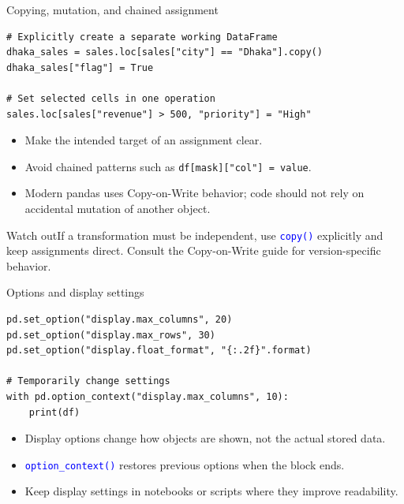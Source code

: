 \documentclass[aspectratio=169,10pt]{beamer}
\newcommand{\pitfall}[1]{\begin{alertblock}{Watch out}#1\end{alertblock}}
\newcommand{\method}[1]{\texttt{\textcolor{Blue}{#1}}}
\begin{document}
\begin{frame}[fragile]{Copying, mutation, and chained assignment}
\begin{lstlisting}
# Explicitly create a separate working DataFrame
dhaka_sales = sales.loc[sales["city"] == "Dhaka"].copy()
dhaka_sales["flag"] = True

# Set selected cells in one operation
sales.loc[sales["revenue"] > 500, "priority"] = "High"
\end{lstlisting}
\begin{itemize}
\item Make the intended target of an assignment clear.
\item Avoid chained patterns such as \texttt{df[mask]["col"] = value}.
\item Modern pandas uses Copy-on-Write behavior; code should not rely on accidental mutation of another object.
\end{itemize}
\pitfall{If a transformation must be independent, use \method{copy()} explicitly and keep assignments direct. Consult the Copy-on-Write guide for version-specific behavior.}
\end{frame}

\begin{frame}[fragile]{Options and display settings}
\begin{lstlisting}
pd.set_option("display.max_columns", 20)
pd.set_option("display.max_rows", 30)
pd.set_option("display.float_format", "{:.2f}".format)

# Temporarily change settings
with pd.option_context("display.max_columns", 10):
    print(df)
\end{lstlisting}
\begin{itemize}
\item Display options change how objects are shown, not the actual stored data.
\item \method{option\_context()} restores previous options when the block ends.
\item Keep display settings in notebooks or scripts where they improve readability.
\end{itemize}
\end{frame}
\end{document}
